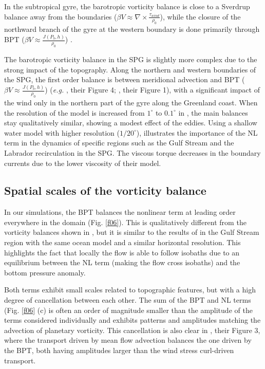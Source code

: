 \documentclass[os, manuscript]{copernicus}
\begin{document}
In the subtropical gyre, the barotropic vorticity balance is close to a Sverdrup balance away from the boundaries ($\beta V \approx \nabla \times \frac{\tau _{wind}}{\rho_{0}}$), while the closure of the northward branch of the gyre at the western boundary is done primarily through BPT ($\beta V \approx \frac{J(P_b,h)}{\rho _0}$)  \citep{schoonover2016}.

The barotropic vorticity balance in the SPG is slightly more complex due to the strong impact of the topography. Along the northern and western boundaries of the SPG, the first order balance is between meridional advection and BPT ($\beta V \approx \frac{J(P_b,h)}{\rho _0}$) (\textit{e.g.} \citet{hughes2001}, their Figure 4; \citet{yeager2015}, their Figure 1), with a significant impact of the wind only in the northern part of the gyre along the Greenland coast. When the resolution of the model is increased from $1^{\circ}$ to $0.1^{\circ}$ in \citet{yeager2015}, the main balances stay qualitatively similar, showing a modest effect of the eddies. Using a shallow water model with higher resolution ($1/20^{\circ}$), \cite{wang2017} illustrates the importance of the NL term in the dynamics of specific regions such as the Gulf Stream and the Labrador recirculation in the SPG. The viscous torque decreases in the boundary currents due to the lower viscosity of their model.

\subsection{Spatial scales of the vorticity balance}

In our simulations, the BPT balances the nonlinear term at leading order everywhere in the domain  (Fig. \ref{f06}). This is qualitatively different from the vorticity balances shown in \citet{yeager2015}, but it is similar to the results of \citet{gula2015} in the Gulf Stream region with the same ocean model and a similar horizontal resolution. This highlights the fact that locally the flow is able to follow isobaths due to an equilibrium between the NL term (making the flow cross isobaths) and the bottom pressure anomaly.

Both terms exhibit small scales related to topographic features, but with a high degree of cancellation between each other. The sum of the BPT and NL terms (Fig. \ref{f06} (c) is often an order of magnitude smaller than the amplitude of the terms considered individually and exhibits patterns and amplitudes matching the advection of planetary vorticity. This cancellation is also clear in \cite{wang2017}, their Figure 3, where the transport driven by mean flow advection balances the one driven by the BPT, both having amplitudes larger than the wind stress curl-driven transport.
\end{document}
